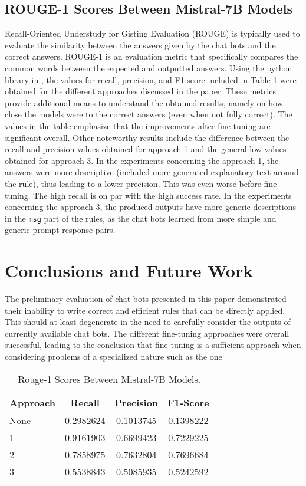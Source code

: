 \documentclass[sigconf]{acmart}
\begin{document}
\subsection{ROUGE-1 Scores Between Mistral-7B Models}
Recall-Oriented Understudy for Gisting Evaluation (ROUGE) \cite{Lin04} is typically used to evaluate the similarity between the answers given by the chat bots and the correct answers. ROUGE-1 is an evaluation metric that specifically compares the common words between the expected and outputted answers. Using the python library in \cite{Tardy21}, the values for recall, precision, and F1-score included in Table \ref{tab:rouge} were obtained for the different approaches discussed in the paper. These metrics provide additional means to understand the obtained results, namely on how close the models were to the correct answers (even when not fully correct). The values in the table emphasize that the improvements after fine-tuning are significant overall. Other noteworthy results include the difference between the recall and precision values obtained for approach 1 and the general low values obtained for approach 3. In the experiments concerning the approach 1, the answers were more descriptive (included more generated explanatory text around the rule), thus leading to a lower precision. This was even worse before fine-tuning. The high recall is on par with the high success rate. In the experiments concerning the approach 3, the produced outputs have more generic descriptions in the \texttt{msg} part of the rules, as the chat bots learned from more simple and generic prompt-response pairs.

\section{Conclusions and Future Work}\label{sec:conclusion}
The preliminary evaluation of chat bots presented in this paper demonstrated their inability to write correct and efficient rules that can be directly applied. This should at least degenerate in the need to carefully consider the outputs of currently available chat bots. The different fine-tuning approaches were overall successful, leading to the conclusion that fine-tuning is a sufficient approach when considering problems of a specialized nature such as the one 

\begin{table}[h]
  \caption{Rouge-1 Scores Between Mistral-7B Models.}
  \label{tab:rouge}
  \begin{tabular}{@{}lccc@{}}
    \toprule
    \textbf{Approach} & \textbf{Recall} & \textbf{Precision} & \textbf{F1-Score} \\
    \midrule
    None & 0.2982624 & 0.1013745 & 0.1398222 \\
    1    & 0.9161903 & 0.6699423 & 0.7229225 \\
    2    & 0.7858975 & 0.7632804 & 0.7696684 \\
    3    & 0.5538843 & 0.5085935 & 0.5242592 \\
    \bottomrule
  \end{tabular}
\end{table}
\end{document}
